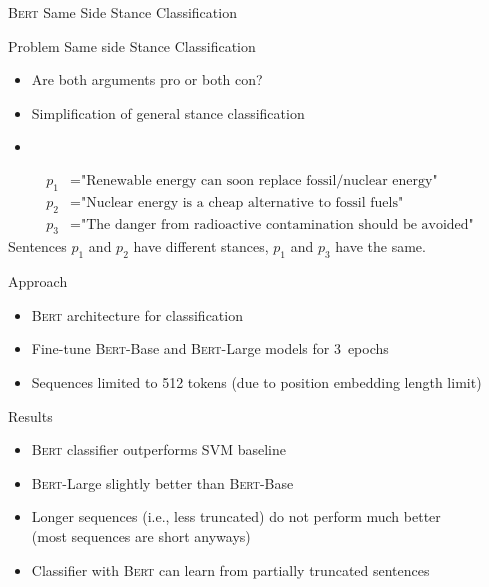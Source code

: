 \documentclass[english,handout]{mlutalk}
\newcommand{\Bert}{\textsc{Bert}\xspace}
\newcommand{\BertBase}{\textsc{Bert}-Base\xspace}
\newcommand{\BertLarge}{\textsc{Bert}-Large\xspace}
\begin{document}
\begin{frame}[allowframebreaks]{\Bert Same Side Stance Classification~\cite{OllingerDSBS2020}}
  
  \begin{block}{Problem}
    Same side  Stance Classification
    \begin{itemize}
      \item Are both arguments pro or both con?
      \item Simplification of general stance classification
      \item 
    \end{itemize}
  \end{block}

  \begin{example}
    \begin{align}
      p_1 &= \text{"Renewable energy can soon replace fossil/nuclear energy"} \\
      p_2 &= \text{"Nuclear energy is a cheap alternative to fossil fuels"} \\
      p_3 &= \text{"The danger from radioactive contamination should be avoided"}
    \end{align}
    Sentences \(p_1\) and \(p_2\) have different stances, \(p_1\) and \(p_3\) have the same.
  \end{example}
  
  \framebreak
  
  \begin{block}{Approach}
    \begin{itemize}
      \item \Bert architecture for classification
      \item Fine-tune \BertBase and \BertLarge models for 3~epochs
      \item Sequences limited to 512 tokens (due to position embedding length limit)
    \end{itemize}
  \end{block}

  \begin{block}{Results}
    \begin{itemize}
      \item \Bert classifier outperforms SVM baseline
      \item \BertLarge slightly better than \BertBase
      \item Longer sequences (i.e., less truncated) do not perform much better \\ (most sequences are short anyways)
      \item Classifier with \Bert can learn from partially truncated sentences
    \end{itemize}
  \end{block}

\end{frame}
\end{document}

